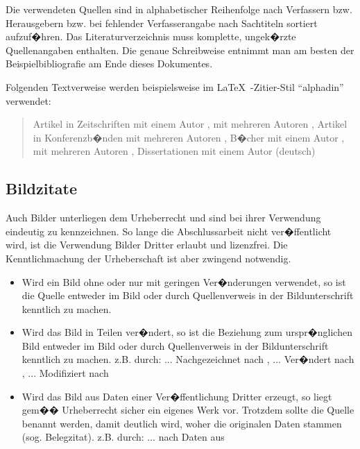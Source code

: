 \clearpage

Die verwendeten Quellen sind in alphabetischer Reihenfolge nach Verfassern bzw. Herausgebern bzw.
bei fehlender Verfasserangabe nach Sachtiteln sortiert aufzuf�hren. Das Literaturverzeichnis muss
komplette, ungek�rzte Quellenangaben enthalten. Die genaue Schreibweise entnimmt man am besten der
Beispielbibliografie am Ende dieses Dokumentes.

Folgenden Textverweise werden beispielsweise im \LaTeX\ -Zitier-Stil "`alphadin"' verwendet:
\begin{quotation}
Artikel in Zeitschriften mit einem Autor \cite{Akaike1974a}, mit mehreren Autoren
\cite{Aschoff1999a}, Artikel in Konferenzb�nden mit mehreren Autoren \cite{Walter12.-16.6.1998a},
B�cher mit einem Autor \cite{Schiller:Tell}, mit mehreren Autoren \cite{Goossens:LatexBegleiter},
Dissertationen mit einem Autor (deutsch) \cite{walter2002}
\end{quotation}


\subsection{Bildzitate}
Auch Bilder unterliegen dem Urheberrecht und sind bei ihrer Verwendung eindeutig zu kennzeichnen. So lange die Abschlussarbeit nicht ver�ffentlicht wird, ist die Verwendung Bilder Dritter erlaubt und lizenzfrei. Die Kenntlichmachung der Urheberschaft ist aber zwingend notwendig.

\begin{itemize}
\item Wird ein Bild ohne oder nur mit geringen Ver�nderungen verwendet, so ist die Quelle entweder im Bild oder durch Quellenverweis in der Bildunterschrift kenntlich zu machen.
\item Wird das Bild in Teilen ver�ndert, so ist die Beziehung zum urspr�nglichen Bild entweder im Bild oder durch Quellenverweis in der Bildunterschrift kenntlich zu machen. z.B. durch: ... Nachgezeichnet nach \cite{walter2002}, ... Ver�ndert nach \cite{Aschoff1999a}, ... Modifiziert nach \cite{walter2002}
\item Wird das Bild aus Daten einer Ver�ffentlichung Dritter erzeugt, so liegt gem�� Urheberrecht sicher ein eigenes Werk vor. Trotzdem sollte die Quelle benannt werden, damit deutlich wird, woher die originalen Daten stammen (sog. Belegzitat). z.B. durch: ... nach Daten aus \cite{Akaike1974a}
\end{itemize}




